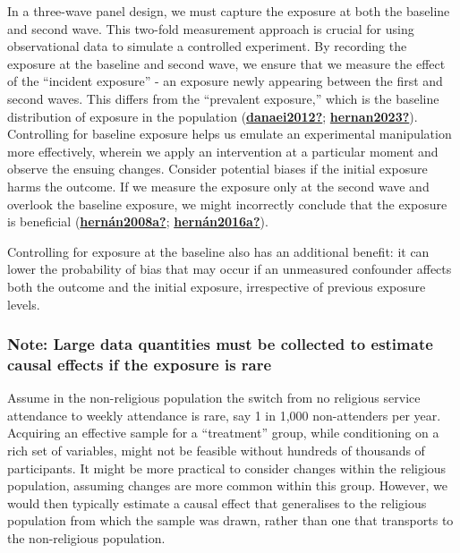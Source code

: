\documentclass[
  singlecolumn]{report}
\begin{document}
In a three-wave panel design, we must capture the exposure at both the
baseline and second wave. This two-fold measurement approach is crucial
for using observational data to simulate a controlled experiment. By
recording the exposure at the baseline and second wave, we ensure that
we measure the effect of the ``incident exposure'' - an exposure newly
appearing between the first and second waves. This differs from the
``prevalent exposure,'' which is the baseline distribution of exposure
in the population
(\protect\hyperlink{ref-danaei2012}{\textbf{danaei2012?}};
\protect\hyperlink{ref-hernan2023}{\textbf{hernan2023?}}). Controlling
for baseline exposure helps us emulate an experimental manipulation more
effectively, wherein we apply an intervention at a particular moment and
observe the ensuing changes. Consider potential biases if the initial
exposure harms the outcome. If we measure the exposure only at the
second wave and overlook the baseline exposure, we might incorrectly
conclude that the exposure is beneficial
(\protect\hyperlink{ref-hernuxe1n2008a}{\textbf{hernán2008a?}};
\protect\hyperlink{ref-hernuxe1n2016a}{\textbf{hernán2016a?}}).

Controlling for exposure at the baseline also has an additional benefit:
it can lower the probability of bias that may occur if an unmeasured
confounder affects both the outcome and the initial exposure,
irrespective of previous exposure levels.

\hypertarget{note-large-data-quantities-must-be-collected-to-estimate-causal-effects-if-the-exposure-is-rare}{%
\subsubsection{\texorpdfstring{\textbf{Note: Large data quantities must
be collected to estimate causal effects if the exposure is
rare}}{Note: Large data quantities must be collected to estimate causal effects if the exposure is rare}}\label{note-large-data-quantities-must-be-collected-to-estimate-causal-effects-if-the-exposure-is-rare}}

Assume in the non-religious population the switch from no religious
service attendance to weekly attendance is rare, say 1 in 1,000
non-attenders per year. Acquiring an effective sample for a
``treatment'' group, while conditioning on a rich set of variables,
might not be feasible without hundreds of thousands of participants. It
might be more practical to consider changes within the religious
population, assuming changes are more common within this group. However,
we would then typically estimate a causal effect that generalises to the
religious population from which the sample was drawn, rather than one
that transports to the non-religious population.
\end{document}
